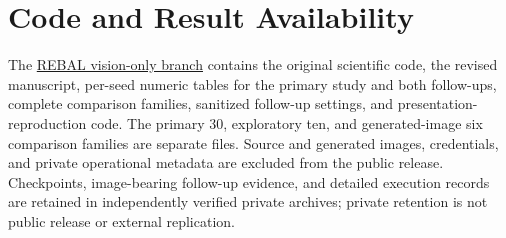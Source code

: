 \documentclass[conference]{IEEEtran}
\begin{document}
\section*{Code and Result Availability}
The \href{https://github.com/savannahshannon/rebal/tree/vision-only-fullscale/vision_only}{REBAL vision-only branch} contains the original scientific code, the revised manuscript, per-seed numeric tables for the primary study and both follow-ups, complete comparison families, sanitized follow-up settings, and presentation-reproduction code. The primary 30, exploratory ten, and generated-image six comparison families are separate files. Source and generated images, credentials, and private operational metadata are excluded from the public release. Checkpoints, image-bearing follow-up evidence, and detailed execution records are retained in independently verified private archives; private retention is not public release or external replication.
\end{document}
